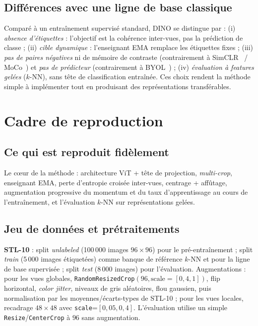 \documentclass[11pt,a4paper]{article}
\begin{document}
\subsection{Différences avec une ligne de base classique}
Comparé à un entraînement supervisé standard, DINO se distingue par : (i) \emph{absence
d'étiquettes} : l'objectif est la cohérence inter-vues, pas la prédiction de classe ; (ii)
\emph{cible dynamique} : l'enseignant EMA remplace les étiquettes fixes ; (iii) \emph{pas de
paires négatives} ni de mémoire de contraste (contrairement à SimCLR~\cite{chen2020simclr} /
MoCo~\cite{he2020moco}) et \emph{pas de prédicteur} (contrairement à BYOL~\cite{grill2020byol}) ; (iv) \emph{évaluation à features gelées} ($k$-NN), sans
tête de classification entraînée. Ces choix rendent la méthode simple à implémenter tout en
produisant des représentations transférables.

\section{Cadre de reproduction}

\subsection{Ce qui est reproduit fidèlement}
Le c\oe ur de la méthode : architecture ViT + tête de projection, \emph{multi-crop}, enseignant
EMA, perte d'entropie croisée inter-vues, centrage + affûtage, augmentation progressive du momentum
et du taux d'apprentissage au cours de l'entraînement, et l'évaluation $k$-NN sur représentations
gelées.

\subsection{Jeu de données et prétraitements}
\textbf{STL-10} : split \emph{unlabeled} (100\,000 images $96\times96$) pour le
pré-entraînement ; split \emph{train} (5\,000 images étiquetées) comme banque de référence
$k$-NN et pour la ligne de base supervisée ; split \emph{test} (8\,000 images) pour l'évaluation.
Augmentations : pour les vues globales, \texttt{RandomResizedCrop}$(96, \text{scale}=[0{,}4,1])$,
flip horizontal, \emph{color jitter}, niveaux de gris aléatoires, flou gaussien, puis
normalisation par les moyennes/écarts-types de STL-10 ; pour les vues locales, recadrage
$48\times48$ avec \texttt{scale}=$[0{,}05,0{,}4]$. L'évaluation utilise un simple
\texttt{Resize}/\texttt{CenterCrop} à $96$ sans augmentation.
\end{document}
